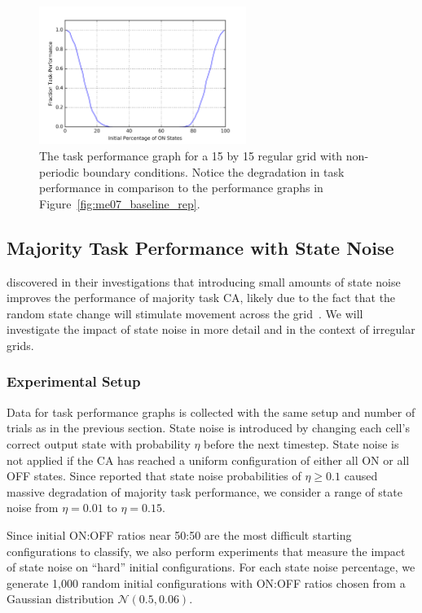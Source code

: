 \documentclass[a4paper,11pt]{article}
\begin{document}
\begin{figure}[htp]
\centering
\includegraphics[width=0.6\textwidth]{ch5_figs/lm_baseline_reg_nontor}
\caption[Local Majority Task Performance on a Non-Periodic Regular Grid]{
  The task performance graph for a 15 by 15 regular grid with non-periodic boundary conditions. Notice the degradation in task performance in comparison to the performance graphs in Figure~\ref{fig:me07_baseline_rep}.
}
\label{fig:lm_reg_nonper}
\end{figure}

\subsection{Majority Task Performance with State Noise}

\citeauthor{me07} discovered in their investigations that introducing small amounts of state noise improves the performance of majority task CA, likely due to the fact that the random state change will stimulate movement across the grid~\cite{me07}. We will investigate the impact of state noise in more detail and in the context of irregular grids. 

\subsubsection*{Experimental Setup}

Data for task performance graphs is collected with the same setup and number of trials as in the previous section. State noise is introduced by changing each cell's correct output state with probability $\eta$ before the next timestep. State noise is not applied if the CA has reached a uniform configuration of either all ON or all OFF states. Since \citeauthor{me07} reported that state noise probabilities of $\eta \ge 0.1$ caused massive degradation of majority task performance, we consider a range of state noise from $\eta=0.01$ to $\eta=0.15$.

Since initial ON:OFF ratios near 50:50 are the most difficult starting configurations to classify, we also perform experiments that measure the impact of state noise on ``hard'' initial configurations. For each state noise percentage, we generate 1,000 random initial configurations with ON:OFF ratios chosen from a Gaussian distribution $\mathcal{N}(0.5, 0.06)$.
\end{document}
